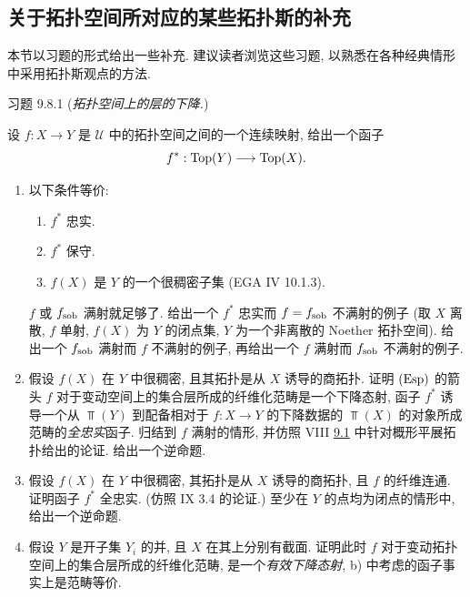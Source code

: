 \subsection{关于拓扑空间所对应的某些拓扑斯的补充}

本节以习题的形式给出一些补充.
建议读者浏览这些习题, 以熟悉在各种经典情形中采用拓扑斯观点的方法.

\begin{enonce*}[remark]{习题 9.8.1}
(\emph{拓扑空间上的层的下降.})

设 $f:X\rightarrow Y$ 是 $𝒰$ 中的拓扑空间之间的一个连续映射,
给出一个函子
$$
f^{\ast}:\operatorname{Top}(Y)\longrightarrow\operatorname{Top}(X){}.
$$
\begin{enumerate}
\renewcommand{\theenumi}{\alph{enumi}}
\renewcommand{\labelenumi}{\theenumi)}
\item 以下条件等价:
\begin{enumerate}
\renewcommand{\theenumii}{\roman{enumii}}
\renewcommand{\labelenumii}{(\theenumii)}
\item $f^{\ast}$ 忠实.

\item $f^{\ast}$ 保守.

\item $f(X)$ 是 $Y$ 的一个很稠密子集 (EGA IV 10.1.3).
\end{enumerate}
$f$ 或 $f_{\operatorname{sob}}$ 满射就足够了.
给出一个 $f^{\ast}$ 忠实而 $f=f_{\operatorname{sob}}$ 不满射的例子
(取 $X$ 离散, $f$ 单射, $f(X)$ 为 $Y$ 的闭点集,
$Y$ 为一个非离散的 Noether 拓扑空间).
给出一个 $f_{\operatorname{sob}}$ 满射而 $f$ 不满射的例子,
再给出一个 $f$ 满射而 $f_{\operatorname{sob}}$ 不满射的例子.

\item 假设 $f(X)$ 在 $Y$ 中很稠密,
且其拓扑是从 $X$ 诱导的商拓扑.
证明 $(\operatorname{Esp})$ 的箭头 $f$
对于变动空间上的集合层所成的纤维化范畴是一个下降态射,
\ie 函子 $f^{\ast}$
诱导\pageoriginale 一个从 $\Top(Y)$
到配备相对于 $f:X\rightarrow Y$ 的下降数据的
$\Top(X)$ 的对象所成范畴的\emph{全忠实}函子.
归结到 $f$ 满射的情形,
并仿照 VIII \hyperref[VIII.prop9.1]{9.1} 中针对概形平展拓扑给出的论证.
给出一个逆命题.

\item 假设 $f(X)$ 在 $Y$ 中很稠密,
其拓扑是从 $X$ 诱导的商拓扑, 且 $f$ 的纤维连通.
证明函子 $f^{\ast}$ 全忠实.
(仿照  IX 3.4 的论证.)
至少在 $Y$ 的点均为闭点的情形中, 给出一个逆命题.

\item 假设 $Y$ 是开子集 $Y_i$ 的并,
且 $X$ 在其上分别有截面.
证明此时 $f$ 对于变动拓扑空间上的集合层所成的纤维化范畴,
是一个\emph{有效下降态射},
\ie b) 中考虑的函子事实上是范畴等价.
\end{enumerate}
\end{enonce*}

